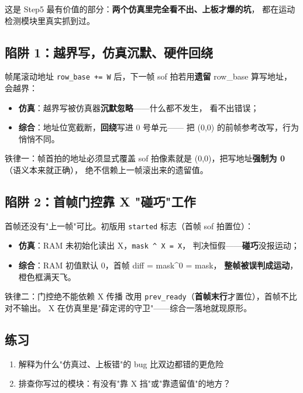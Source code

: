 \documentclass[11pt]{ctexart}
\newcommand{\code}[1]{\texttt{#1}}
\begin{document}
这是 Step5 最有价值的部分：\textbf{两个仿真里完全看不出、上板才爆的坑}，
都在运动检测模块里真实抓到过。

\subsection{陷阱 1：越界写，仿真沉默、硬件回绕}

帧尾滚动地址 \code{row\_base += W} 后，下一帧 sof 拍若用\textbf{遗留}
row\_base 算写地址，会越界：

\begin{itemize}
  \item \textbf{仿真}：越界写被仿真器\textbf{沉默忽略}——什么都不发生，
    看不出错误；
  \item \textbf{综合}：地址位宽截断，\textbf{回绕}写进 0 号单元——
    把 (0,0) 的前帧参考改写，行为悄悄不同。
\end{itemize}

\begin{warnbox}{铁律一：帧首拍的地址必须显式覆盖}
sof 拍像素就是 (0,0)，把写地址\textbf{强制为 0}（语义本来就正确），
绝不信赖上一帧滚出来的遗留值。
\end{warnbox}

\subsection{陷阱 2：首帧门控靠 X "碰巧"工作}

首帧还没有"上一帧"可比。初版用 \code{started} 标志（首帧 sof 拍置位）：

\begin{itemize}
  \item \textbf{仿真}：RAM 未初始化读出 X，\code{mask \^{} X = X}，
    判决恒假——\textbf{碰巧}没报运动；
  \item \textbf{综合}：RAM 初值默认 0，首帧 diff = mask\^{}0 = mask，
    \textbf{整帧被误判成运动}，橙色框满天飞。
\end{itemize}

\begin{warnbox}{铁律二：门控绝不能依赖 X 传播}
改用 \code{prev\_ready}（\textbf{首帧末行}才置位），首帧不比对不输出。
X 在仿真里是"薛定谔的守卫"——综合一落地就现原形。
\end{warnbox}

\subsection{练习}

\begin{enumerate}
  \item 解释为什么"仿真过、上板错"的 bug 比双边都错的更危险
  \item 排查你写过的模块：有没有"靠 X 挡"或"靠遗留值"的地方？
\end{enumerate}
\end{document}
